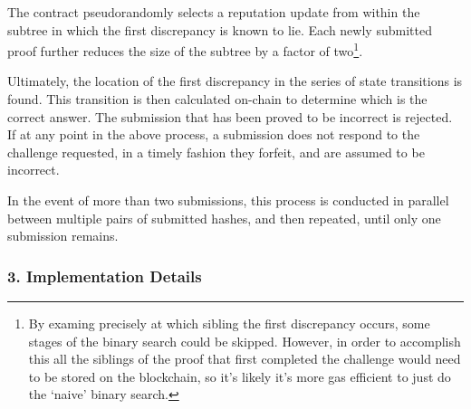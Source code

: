 The contract pseudorandomly selects a reputation update from within the subtree in which the first discrepancy is known to lie. Each newly submitted proof further reduces the size of the subtree by a factor of two\footnote{ By examing precisely at which sibling the first discrepancy occurs, some stages of the binary search could be skipped. However, in order to accomplish this all the siblings of the proof that first completed the challenge would need to be stored on the blockchain, so it’s likely it’s more gas efficient to just do the ‘naive’ binary search.}.

Ultimately, the location of the first discrepancy in the series of state transitions is found. This transition is then calculated on-chain to determine which is the correct answer. The submission that has been proved to be incorrect is rejected. If at any point in the above process, a submission does not respond to the challenge requested, in a timely fashion they forfeit, and are assumed to be incorrect.

In the event of more than two submissions, this process is conducted in parallel between multiple pairs of submitted hashes, and then repeated, until only one submission remains.

\subsubsection*{3. Implementation Details}





